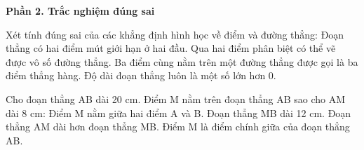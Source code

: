 \textbf{Phần 2. Trắc nghiệm đúng sai}

\begin{ex} %
Xét tính đúng sai của các khẳng định hình học về điểm và đường thẳng:
\choiceTF
{\True Đoạn thẳng có hai điểm mút giới hạn ở hai đầu.}
{Qua hai điểm phân biệt có thể vẽ được vô số đường thẳng.}
{\True Ba điểm cùng nằm trên một đường thẳng được gọi là ba điểm thẳng hàng.}
{\True Độ dài đoạn thẳng luôn là một số lớn hơn 0.}
\end{ex}

\begin{ex} %
Cho đoạn thẳng AB dài 20 cm. Điểm M nằm trên đoạn thẳng AB sao cho AM dài 8 cm:
\choiceTF
{\True Điểm M nằm giữa hai điểm A và B.}
{\True Đoạn thẳng MB dài 12 cm.}
{Đoạn thẳng AM dài hơn đoạn thẳng MB.}
{Điểm M là điểm chính giữa của đoạn thẳng AB.}
\end{ex}

